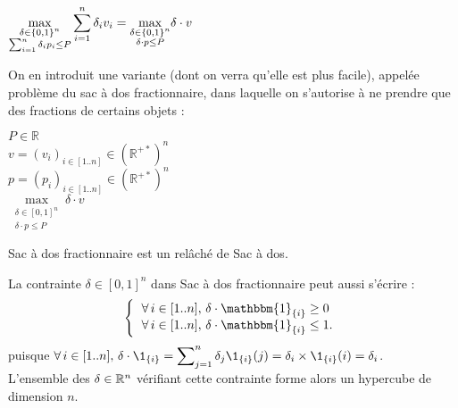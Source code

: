 			\begin{center}
				{\(\underset{\substack{\delta \in \{ 0,1 \}^n \\ \sum_{i=1}^{n} \delta_i p_i \leq P}}{\max} \displaystyle \sum_{i=1}^{n} \delta_i v_i = \underset{\substack{\delta \in \{ 0,1 \}^n \\ \delta \cdot p \leq P}}{\max} \delta \cdot v\)}{}
			\end{center}
			
			On en introduit une variante (dont on verra qu'elle est plus facile), appelée problème du sac à dos fractionnaire, dans laquelle on s'autorise à ne prendre que des fractions de certains objets :
			
			\begin{center}
				{$P \in \mathbb{R}$ \\ \entspace $v = (v_i)_{i \in [1 .. n]} \in (\mathbb{R^{+*}})^n$ \\ \entspace $p = (p_i)_{i \in [1 .. n]} \in (\mathbb{R}^{+*})^n$ \\[-4mm]}
				{\( \underset{\substack{\delta \in [0,1]^n \\ \delta \cdot p \leq P}}{\max} \delta \cdot v \)}
			\end{center} 
			
			\begin{Remarque}
				\textsf{{Sac à dos fractionnaire}} est un relâché de \textsf{{Sac à dos}}.
			\end{Remarque}
			
			\eqskip{3mm}
			\colsep{1.5pt}
			\begin{Remarque}
				La contrainte $\delta \in [0,1]^n$ dans \textsf{Sac à dos fractionnaire} peut aussi s'écrire :
					\[
						\left\{ \begin{tabular}[h]{l}
							\( \forall \, i \in [1..n], \, \delta \cdot \mathbbm{1}_{\{i\}} \geq 0 \) \\
							\( \forall \, i \in [1..n], \, \delta \cdot \mathbbm{1}_{\{i\}} \leq 1 \). \\
						\end{tabular} \right.
					\]
			puisque \( \forall \, i \in [1..n], \, \delta \dotp \1_{\{i\}} = \displaystyle \sum\nolimits_{j=1}^{n} \delta_j \1_{\{i\}}(j) = \delta_i \x \1_{\{i\}}(i) = \delta_i \). \\
			L'ensemble des \(\delta \in \mathcal{\mathbb{R}}^n\) vérifiant cette contrainte forme alors un hypercube de dimension \(n\).
			\end{Remarque}
			
